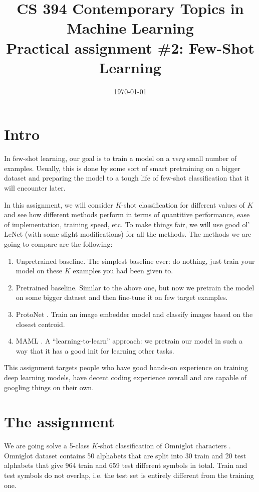\documentclass[letterpaper,12pt]{article}
\title{
CS 394 Contemporary Topics in Machine Learning
\\
Practical assignment \#2: Few-Shot Learning
}
\date{\today}
\begin{document}
\maketitle

\section{Intro}

In few-shot learning, our goal is to train a model on a \textit{very} small number of examples.
Usually, this is done by some sort of smart pretraining on a bigger dataset and preparing the model to a tough life of few-shot classification that it will encounter later.

In this assignment, we will consider $K$-shot classification for different values of $K$ and see how different methods perform in terms of quantitive performance, ease of implementation, training speed, etc.
To make things fair, we will use good ol' LeNet (with some slight modifications) for all the methods.
The methods we are going to compare are the following:
\begin{enumerate}
    \item Unpretrained baseline. The simplest baseline ever: do nothing, just train your model on these $K$ examples you had been given to.
    \item Pretrained baseline. Similar to the above one, but now we pretrain the model on some bigger dataset and then fine-tune it on few target examples.
    \item ProtoNet \cite{ProtoNet}. Train an image embedder model and classify images based on the closest centroid.
    \item MAML \cite{MAML}. A ``learning-to-learn'' approach: we pretrain our model in such a way that it has a good init for learning other tasks.
\end{enumerate}

This assignment targets people who have good hands-on experience on training deep learning models, have decent coding experience overall and are capable of googling things on their own.

\section{The assignment}
We are going solve a 5-class $K$-shot classification of Omniglot characters \cite{Omniglot}.
Omniglot dataset contains 50 alphabets that are split into 30 train and 20 test alphabets that give  964 train and 659 test different symbols in total.
Train and test symbols do not overlap, i.e. the test set is entirely different from the training one.
\end{document}
